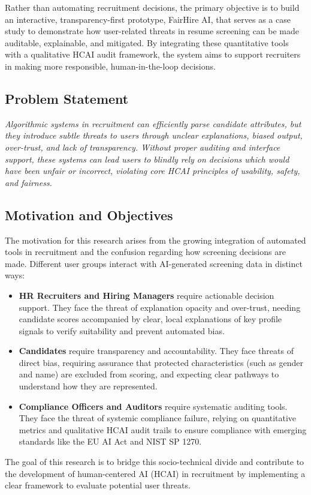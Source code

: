 \documentclass[sigconf]{acmart}
\begin{document}
Rather than automating recruitment decisions, the primary objective is to build an interactive, transparency-first prototype, FairHire AI, that serves as a case study to demonstrate how user-related threats in resume screening can be made auditable, explainable, and mitigated. By integrating these quantitative tools with a qualitative HCAI audit framework, the system aims to support recruiters in making more responsible, human-in-the-loop decisions.

\subsection{Problem Statement}
\textit{Algorithmic systems in recruitment can efficiently parse candidate attributes, but they introduce subtle threats to users through unclear explanations, biased output, over-trust, and lack of transparency. Without proper auditing and interface support, these systems can lead users to blindly rely on decisions which would have been unfair or incorrect, violating core HCAI principles of usability, safety, and fairness.}

\subsection{Motivation and Objectives}
The motivation for this research arises from the growing integration of automated tools in recruitment and the confusion regarding how screening decisions are made. Different user groups interact with AI-generated screening data in distinct ways:
\begin{itemize}
    \item \textbf{HR Recruiters and Hiring Managers} require actionable decision support. They face the threat of explanation opacity and over-trust, needing candidate scores accompanied by clear, local explanations of key profile signals to verify suitability and prevent automated bias.
    \item \textbf{Candidates} require transparency and accountability. They face threats of direct bias, requiring assurance that protected characteristics (such as gender and name) are excluded from scoring, and expecting clear pathways to understand how they are represented.
    \item \textbf{Compliance Officers and Auditors} require systematic auditing tools. They face the threat of systemic compliance failure, relying on quantitative metrics and qualitative HCAI audit trails to ensure compliance with emerging standards like the EU AI Act and NIST SP 1270.
\end{itemize}
The goal of this research is to bridge this socio-technical divide and contribute to the development of human-centered AI (HCAI) in recruitment by implementing a clear framework to evaluate potential user threats.
\end{document}
